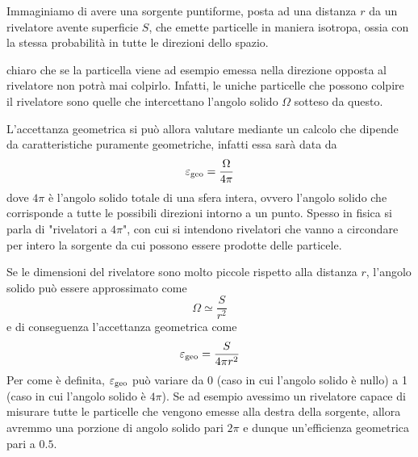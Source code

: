   \begin{esempio}
      Immaginiamo di avere una sorgente puntiforme, posta ad una distanza $r$ da un rivelatore avente superficie $S$, che emette particelle in maniera isotropa, ossia con la stessa probabilità in tutte le direzioni dello spazio.
   \begin{figure}[H]
      \centering
   \end{figure}
   \E chiaro che se la particella viene ad esempio emessa nella direzione opposta al rivelatore non potrà mai colpirlo. Infatti, le uniche particelle che possono colpire il rivelatore sono quelle che intercettano l'angolo solido $\Omega$ sotteso da questo.
    
   L'accettanza geometrica si può allora valutare mediante un calcolo che dipende da caratteristiche puramente geometriche, infatti essa sarà data da
   \begin{equation*}
      \varepsilon_{\rm geo}=\frac{\Omega}{4\pi}
   \end{equation*}
   dove $4\pi$ è l'angolo solido totale di una sfera intera, ovvero l'angolo solido che corrisponde a tutte le possibili direzioni intorno a un punto. Spesso in fisica si parla di "rivelatori a $4\pi$", con cui si intendono rivelatori che vanno a circondare per intero la sorgente da cui possono essere prodotte delle particele.

   Se le dimensioni del rivelatore sono molto piccole rispetto alla distanza $r$, l'angolo solido può essere approssimato come
   \begin{equation*}
      \Omega \simeq \frac{S}{r^2}
   \end{equation*}
   e di conseguenza l'accettanza geometrica come
   \begin{equation*}
      \varepsilon_{\rm geo}=\frac{S}{4\pi r^2}
   \end{equation*}
   Per come è definita, $\varepsilon_{\rm geo}$ può variare da 0 (caso in cui l'angolo solido è nullo) a 1 (caso in cui l'angolo solido è $4\pi$). Se ad esempio avessimo un rivelatore capace di misurare tutte le particelle che vengono emesse alla destra della sorgente, allora avremmo una porzione di angolo solido pari $2 \pi$ e dunque un'efficienza geometrica pari a $0.5$.
\end{esempio}

